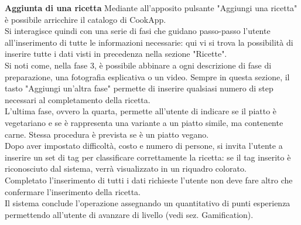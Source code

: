 \textbf{Aggiunta di una ricetta}
Mediante all'apposito pulsante "Aggiungi una ricetta" è possibile arricchire il catalogo di CookApp.\\
Si interagisce quindi con una serie di fasi che guidano passo-passo l'utente all'inserimento di tutte le informazioni necessarie: qui vi si trova la possibilità di inserire tutte i dati visti in precedenza nella sezione "Ricette".\\
Si noti come, nella fase 3, è possibile abbinare a ogni descrizione di fase di preparazione, una fotografia esplicativa o un video. Sempre in questa sezione, il tasto "Aggiungi un'altra fase" permette di inserire qualsiasi numero di step necessari al completamento della ricetta.\\
L'ultima fase, ovvero la quarta, permette all'utente di indicare se il piatto è vegetariano e se è rappresenta una variante a un piatto simile, ma contenente carne. Stessa procedura è prevista se è un piatto vegano.\\
Dopo aver impostato difficoltà, costo e numero di persone, si invita l'utente a inserire un set di tag per classificare correttamente la ricetta: se il tag inserito è riconosciuto dal sistema, verrà visualizzato in un riquadro colorato.\\
Completato l'inserimento di tutti i dati richieste l'utente non deve fare altro che confermare l'inserimento della ricetta.\\
Il sistema conclude l'operazione assegnando un quantitativo di punti esperienza permettendo all'utente di avanzare di livello (vedi sez. Gamification).\\

